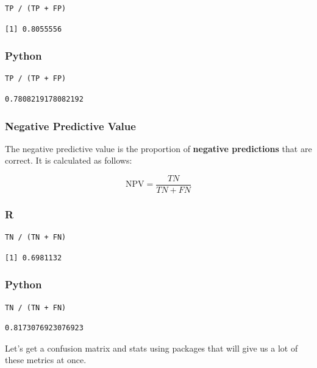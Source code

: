 \documentclass[
  letterpaper,
]{krantz}
\begin{document}
\begin{verbatim}
TP / (TP + FP)
\end{verbatim}

\begin{verbatim}
[1] 0.8055556
\end{verbatim}

\subsubsection{Python}

\begin{verbatim}
TP / (TP + FP)
\end{verbatim}

\begin{verbatim}
0.7808219178082192
\end{verbatim}

\subsubsection{Negative Predictive Value}\label{sec-knowing-metrics-npv}

The negative predictive value is the proportion of \textbf{negative
predictions} that are correct. It is calculated as follows:

\[\text{NPV} = \frac{TN}{TN + FN}\]

\subsubsection{R}

\begin{verbatim}
TN / (TN + FN)
\end{verbatim}

\begin{verbatim}
[1] 0.6981132
\end{verbatim}

\subsubsection{Python}

\begin{verbatim}
TN / (TN + FN)
\end{verbatim}

\begin{verbatim}
0.8173076923076923
\end{verbatim}

Let's get a confusion matrix and stats using packages that will give us
a lot of these metrics at once.
\end{document}
